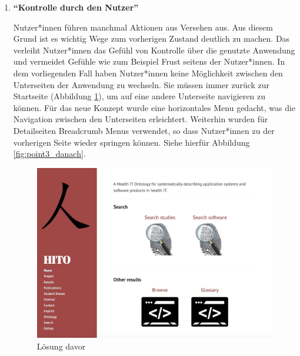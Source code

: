 \begin{enumerate}
\clearpage

\item \textbf{\enquote{Kontrolle durch den Nutzer}} \newline

Nutzer*innen führen manchmal Aktionen aus Versehen aus. 
Aus diesem Grund ist es wichtig Wege zum vorherigen Zustand deutlich zu machen.
Das verleiht Nutzer*innen das Gefühl von Kontrolle über die genutzte Anwendung und vermeidet Gefühle wie zum Beispiel Frust seitens der Nutzer*innen.
In dem vorliegenden Fall haben Nutzer*innen keine Möglichkeit zwischen den Unterseiten der Anwendung zu wechseln.
Sie müssen immer zurück zur Startseite (Abbildung \ref{fig:point3_davor}), um auf eine andere Unterseite navigieren zu können.
Für das neue Konzept wurde eine horizontales Menu gedacht, was die Navigation zwischen den Unterseiten erleichtert.
Weiterhin wurden für Detailseiten Breadcrumb Menus verwendet, so dass Nutzer*innen zu der vorherigen Seite wieder springen können.
Siehe hierfür Abbildung \ref{fig:point3_danach}.

\begin{figure}[H]
	\centering
    	\includegraphics[width=\textwidth]{Images/Punkt_3_davor}
   	\caption{Lösung davor}
   	\label{fig:point3_davor}
\end{figure}


\end{enumerate}
